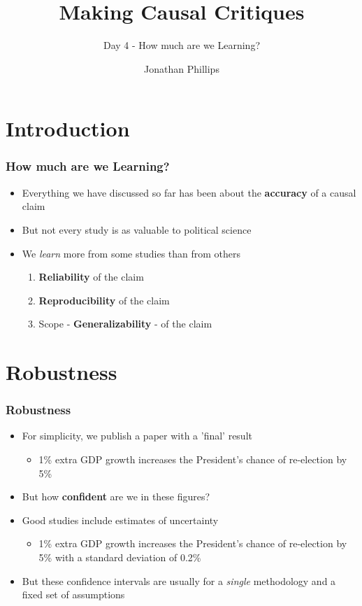 \documentclass[xcolor=x11names,compress]{beamer}\usepackage[]{graphicx}\usepackage[]{color}
\title{Making Causal Critiques}
\subtitle{Day 4 - How much are we Learning?}
\author{Jonathan Phillips}
\renewcommand{\(}{\begin{columns}}
\renewcommand{\)}{\end{columns}}
\newcommand{\<}[1]{\begin{column}{#1}}
\renewcommand{\>}{\end{column}}
\begin{document}
\frame{\titlepage}

\section{Introduction}

\begin{frame}
\frametitle{How much are we Learning?}
\begin{itemize}
\item Everything we have discussed so far has been about the \textbf{accuracy} of a causal claim
\pause
\item But not every study is as valuable to political science
\pause
\item We \textit{learn} more from some studies than from others
\pause
\begin{enumerate}
\item \textbf{Reliability} of the claim
\pause
\item \textbf{Reproducibility} of the claim
\pause
\item Scope - \textbf{Generalizability} - of the claim
\end{enumerate}
\end{itemize}
\end{frame}

\section{Robustness}

\begin{frame}
\frametitle{Robustness}
\begin{itemize}
\item For simplicity, we publish a paper with a 'final' result
\pause
\begin{itemize}
\item 1\% extra GDP growth increases the President's chance of re-election by 5\%
\pause
\end{itemize}
\item But how \textbf{confident} are we in these figures?
\pause
\item Good studies include estimates of uncertainty
\pause
\begin{itemize}
\item 1\% extra GDP growth increases the President's chance of re-election by 5\% with a standard deviation of 0.2\%
\pause
\end{itemize}
\item But these confidence intervals are usually for a \textit{single} methodology and a fixed set of assumptions
\end{itemize}
\end{frame}
\end{document}
